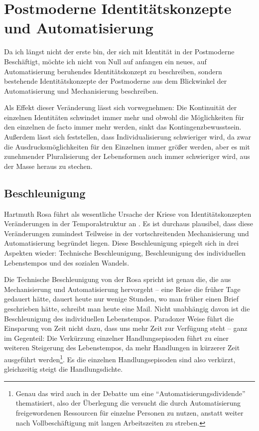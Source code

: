 \section{Postmoderne Identitätskonzepte und Automatisierung}

Da ich längst nicht der erste bin, der sich mit Identität in der Postmoderne Beschäftigt, möchte ich nicht von Null auf anfangen ein neues, auf Automatisierung beruhendes Identitätskonzept zu beschreiben, sondern bestehende Identitätskonzepte der Postmoderne aus dem Blickwinkel der Automatisierung und Mechanisierung beschreiben.

Als Effekt dieser Veränderung lässt sich vorwegnehmen: Die Kontinuität der einzelnen Identitäten schwindet immer mehr und obwohl die Möglichkeiten für den einzelnen de facto immer mehr werden, sinkt das Kontingenzbewusstsein.
Außerdem lässt sich feststellen, dass Individualisierung schwieriger wird, da zwar die Ausdrucksmöglichkeiten für den Einzelnen immer größer werden, aber es mit zunehmender Pluralisierung der Lebensformen auch immer schwieriger wird, aus der Masse heraus zu stechen.


\subsection{Beschleunigung}

Hartmuth Rosa führt als wesentliche Ursache der Kriese von Identitätskonzepten Veränderungen in der Temporalstruktur an \parencite{rosa}.
Es ist durchaus plausibel, dass diese Veränderungen zumindest Teilweise in der vortschreitenden Mechanisierung und Automatisierung begründet liegen.
Diese Beschleunigung spiegelt sich in drei Aspekten wieder: Technische Beschleunigung, Beschleunigung des individuellen Lebenstempos und des sozialen Wandels.

Die Technische Beschleunigung von der Rosa spricht ist genau die, die aus Mechanisierung und Automatisierung hervorgeht – eine Reise die früher Tage gedauert hätte, dauert heute nur wenige Stunden, wo man früher einen Brief geschrieben hätte, schreibt man heute eine Mail.
Nicht unabhängig davon ist die Beschleunigung des individuellen Lebenstempos.
Paradoxer Weise führt die Einsparung von Zeit nicht dazu, dass uns mehr Zeit zur Verfügung steht – ganz im Gegenteil: Die Verkürzung einzelner Handlungsepisoden führt zu einer weiteren Steigerung des Lebenstempos, da mehr Handlungen in kürzerer Zeit ausgeführt werden\footnote{Genau das wird auch in der Debatte um eine \enquote{Automatisierungsdividende} thematisiert, also der Überlegung die versucht die durch Automatisierung freigewordenen Ressourcen für einzelne Personen zu nutzen, anstatt weiter nach Vollbeschäftigung mit langen Arbeitszeiten zu streben\parencite{faz}.}.
Es die einzelnen Handlungsepisoden sind also verkürzt, gleichzeitig steigt die Handlungsdichte.

